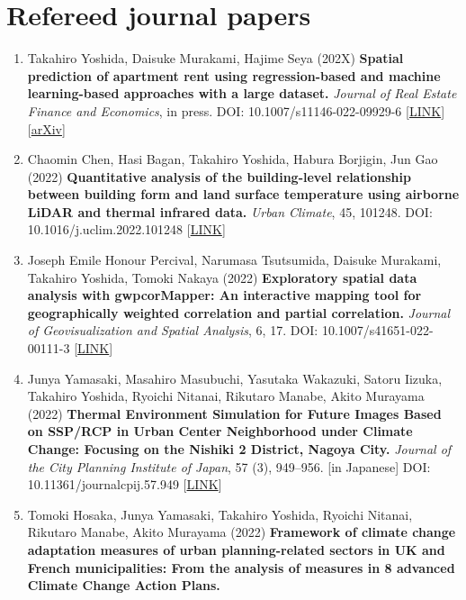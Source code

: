 \documentclass[
]{book}
\providecommand{\tightlist}{%
  \setlength{\itemsep}{0pt}\setlength{\parskip}{0pt}}
\begin{document}
\hypertarget{refereed-journal-papers}{%
\section*{Refereed journal papers}\label{refereed-journal-papers}}

\begin{enumerate}
\def\labelenumi{\arabic{enumi}.}
\tightlist
\item
  Takahiro Yoshida, Daisuke Murakami, Hajime Seya (202X)
  \textbf{Spatial prediction of apartment rent using regression-based and machine learning-based approaches with a large dataset.}
  \emph{Journal of Real Estate Finance and Economics}, in press.
  DOI: 10.1007/s11146-022-09929-6 {[}\href{https://link.springer.com/article/10.1007/s11146-022-09929-6}{LINK}{]} {[}\href{https://arxiv.org/abs/2107.12539}{arXiv}{]}
\item
  Chaomin Chen, Hasi Bagan, Takahiro Yoshida, Habura Borjigin, Jun Gao (2022)
  \textbf{Quantitative analysis of the building-level relationship between building form and land surface temperature using airborne LiDAR and thermal infrared data.}
  \emph{Urban Climate}, 45, 101248.
  DOI: 10.1016/j.uclim.2022.101248 {[}\href{https://doi.org/10.1016/j.uclim.2022.101248}{LINK}{]}
\item
  Joseph Emile Honour Percival, Narumasa Tsutsumida, Daisuke Murakami, Takahiro Yoshida, Tomoki Nakaya (2022)
  \textbf{Exploratory spatial data analysis with gwpcorMapper: An interactive mapping tool for geographically weighted correlation and partial correlation.}
  \emph{Journal of Geovisualization and Spatial Analysis}, 6, 17.
  DOI: 10.1007/s41651-022-00111-3 {[}\href{https://link.springer.com/article/10.1007/s41651-022-00111-3}{LINK}{]}
\item
  Junya Yamasaki, Masahiro Masubuchi, Yasutaka Wakazuki, Satoru Iizuka, Takahiro Yoshida, Ryoichi Nitanai, Rikutaro Manabe, Akito Murayama (2022)
  \textbf{Thermal Environment Simulation for Future Images Based on SSP/RCP in Urban Center Neighborhood under Climate Change: Focusing on the Nishiki 2 District, Nagoya City.}
  \emph{Journal of the City Planning Institute of Japan}, 57 (3), 949--956. {[}in Japanese{]}
  DOI: 10.11361/journalcpij.57.949 {[}\href{https://doi.org/10.11361/journalcpij.57.949}{LINK}{]}
\item
  Tomoki Hosaka, Junya Yamasaki, Takahiro Yoshida, Ryoichi Nitanai, Rikutaro Manabe, Akito Murayama (2022)
  \textbf{Framework of climate change adaptation measures of urban planning-related sectors in UK and French municipalities: From the analysis of measures in 8 advanced Climate Change Action Plans.}

\end{enumerate}
\end{document}
